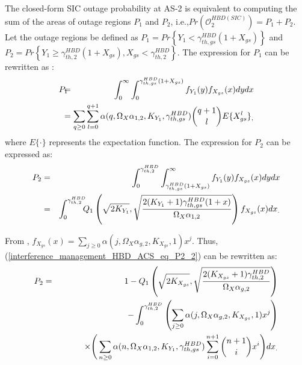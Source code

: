 The closed-form SIC outage probability at AS-2 is equivalent to computing the sum of the areas of outage regions $P_1$ and $P_2$, i.e.,$Pr(\mathcal{O}_{2}^{HBD(SIC)}) = P_1 + P_2$. Let the outage regions be defined as $P_1 = Pr\left\{Y_1 < \gamma_{th,gs}^{HBD}\left(1+X_{gs}\right) \right\}$ and $P_2 = Pr\left\{Y_1 \geq \gamma_{th,2}^{HBD}(1+X_{gs}), X_{gs} < \gamma_{th,2}^{HBD} \right\}$. The expression for $P_1$ can be rewritten as \cite{rached2017unified}:
\begin{eqnarray} \label{interference_management_HBD_ACS_eq_P1_2}
P_1 & \hspace{-0.25cm} = & \hspace{-0.25cm} \int_{0}^{\infty} \int_{0}^{\gamma_{th,gs}^{HBD}(1+X_{gs})} f_{Y_1}(y) f_{X_{gs}}(x) dydx \nonumber \\
 & \hspace{-0.25cm} = & \hspace{-0.25cm} \sum_{q\geq0}\sum_{l=0}^{q+1}\alpha(q,\Omega_X\alpha_{1,2},K_{Y_{1}},\gamma_{th,gs}^{HBD})\binom{q+1}{l}E\{X_{gs}^l\}_,
\end{eqnarray}
where $E\{\cdot\}$ represents the expectation function. The expression for $P_2$ can be expressed as:
\begin{eqnarray} \label{interference_management_HBD_ACS_eq_P2_2}
P_2 & = & \int_{0}^{\gamma_{th,2}^{HBD}} \int_{\gamma_{th,gs}^{HBD}(1+X_{gs})}^{\infty} f_{Y_1}(y) f_{X_{gs}}(x) dydx \nonumber\\
 & = & \int_{0}^{\gamma_{th,2}^{HBD}} \hspace{-0.2cm} Q_1\left( \sqrt{2K_{Y_1}}, \sqrt{\frac{2(K_{Y_1}+1)\gamma_{th,gs}^{HBD}(1+x)}{\Omega_{X}\alpha_{1,2}}} \right) f_{X_{gs}}(x) dx_. 
\end{eqnarray}

From \cite{andras2011generalized}, $f_{X_{gs}}(x) = \sum_{j\geq0}\alpha(j,\Omega_X\alpha_{g,2},K_{X_{gs}},1)x^j$. Thus, (\ref{interference_management_HBD_ACS_eq_P2_2}) can be rewritten as:
\begin{eqnarray} \label{interference_management_HBD_ACS_eq_P2_3}
P_2 & = & 1 - Q_1\left( \sqrt{2K_{X_{gs}}}, \sqrt{\frac{2(K_{X_{gs}}+1)\gamma_{th,2}^{HBD}}{\Omega_{X}\alpha_{g,2}}} \right) \nonumber \\
 & & \hspace{0.5cm} - \int_{0}^{\gamma_{th,2}^{HBD}} \left(\sum_{j\geq0}\alpha(j,\Omega_X\alpha_{g,2},K_{X_{gs}},1)x^j\right) \nonumber\\
 & & \hspace{1cm} \times \Bigg(\sum_{n\geq0}\alpha(n,\Omega_X\alpha_{1,2},K_{Y_1},\gamma_{th,gs}^{HBD})\sum_{i=0}^{n+1}\binom{n+1}{i}x^{i}\Bigg) dx_.
\end{eqnarray}

